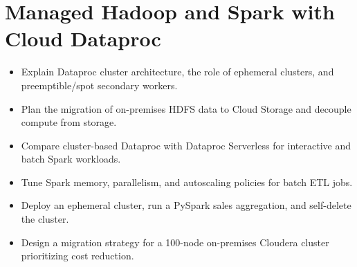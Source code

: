 \chapter{Managed Hadoop and Spark with Cloud Dataproc}

\begin{objectives}
\begin{itemize}
    \item Explain Dataproc cluster architecture, the role of ephemeral clusters, and preemptible/spot secondary workers.
    \item Plan the migration of on-premises HDFS data to Cloud Storage and decouple compute from storage.
    \item Compare cluster-based Dataproc with Dataproc Serverless for interactive and batch Spark workloads.
    \item Tune Spark memory, parallelism, and autoscaling policies for batch ETL jobs.
    \item Deploy an ephemeral cluster, run a PySpark sales aggregation, and self-delete the cluster.
    \item Design a migration strategy for a 100-node on-premises Cloudera cluster prioritizing cost reduction.
\end{itemize}
\end{objectives}

